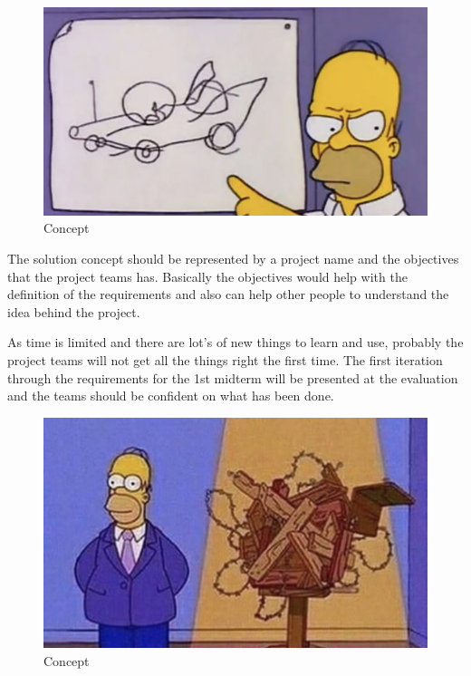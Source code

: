 \begin{figure}[H]
    \includegraphics[width=\textwidth]{images/concept.png}
    \caption{Concept}
    \label{fig:concept}
\end{figure}

The solution concept should be represented by a project name and the objectives that the project teams has.
Basically the objectives would help with the definition of the requirements and also can help other people to understand the idea behind the project.

As time is limited and there are lot's of new things to learn and use, probably the project teams will not get all the things right the first time.
The first iteration through the requirements for the 1st midterm will be presented at the evaluation and the teams should be confident on what has been done.
\vspace{0.5cm}


\begin{figure}[H]
    \includegraphics[width=\textwidth]{images/before.png}
    \caption{Concept}
    \label{fig:before}
\end{figure}

